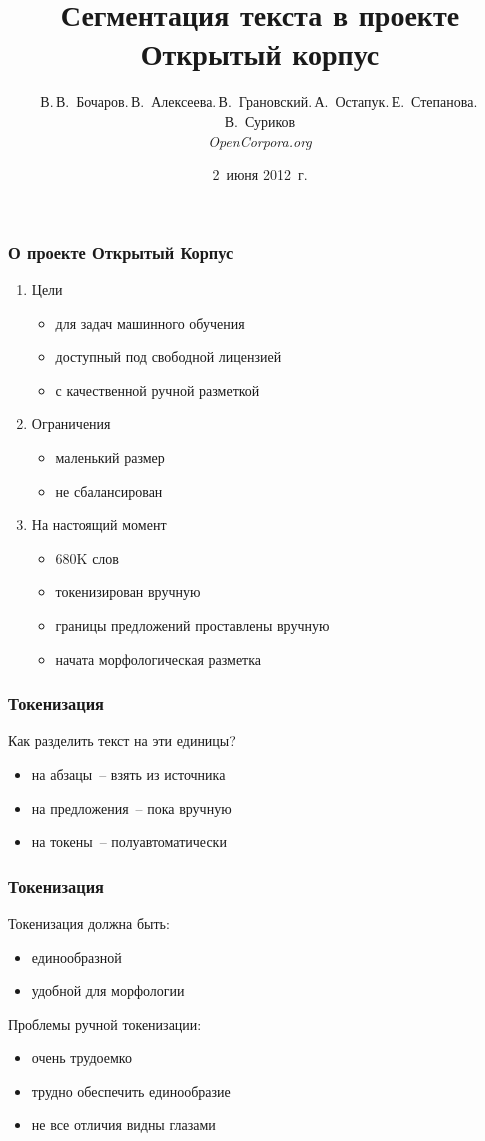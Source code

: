 \documentclass{beamer}
\title{Сегментация текста в проекте Открытый корпус}
\author{В.\,В.~Бочаров\andС.\,В.~Алексеева\andД.\,В.~Грановский\andН.\,А.~Остапук\andМ.\,Е.~Степанова\andА.\,В.~Суриков\\\small\it OpenCorpora.org}
\date{2~июня 2012~г.}
\begin{document}
\maketitle

\begin{frame}
\frametitle{О проекте Открытый Корпус}
\begin{enumerate}
\item{Цели}
    \begin{itemize}
    \item{для задач машинного обучения}
    \item{доступный под свободной лицензией}
    \item{с качественной ручной разметкой}
    \end{itemize}
\item{Ограничения}
    \begin{itemize}
    \item{маленький размер}
    \item{не сбалансирован}
    \end{itemize}
\item{На настоящий момент}
    \begin{itemize}
    \item{680K слов}
    \item{токенизирован вручную}
    \item{границы предложений проставлены вручную}
    \item{начата морфологическая разметка}
    \end{itemize}
\end{enumerate}
\end{frame}

\begin{frame}
\frametitle{Токенизация}
Как разделить текст на эти единицы?
\begin{itemize}
\item{на абзацы~-- взять из источника}
\item{на предложения~-- пока вручную}
\item{на токены~-- полуавтоматически}
\end{itemize}
\end{frame}

\begin{frame}
\frametitle{Токенизация}
Токенизация должна быть:
\begin{itemize}
\item{единообразной}
\item{удобной для морфологии}
\end{itemize}
Проблемы ручной токенизации:
\begin{itemize}
\item{очень трудоемко}
\item{трудно обеспечить единообразие}
\item{не все отличия видны глазами}
\end{itemize}
\end{frame}
\end{document}
